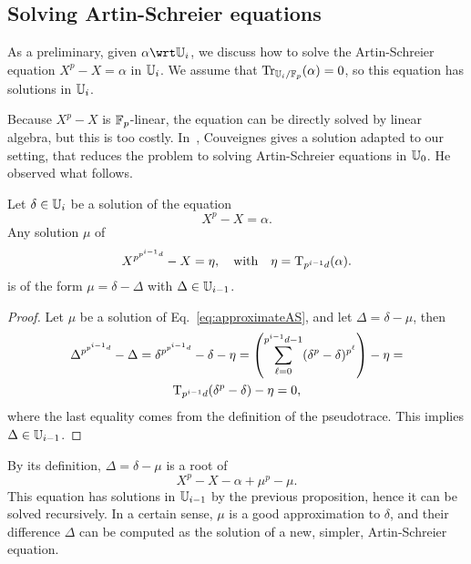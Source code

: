 
\subsection{Solving Artin-Schreier equations} 

As a preliminary, given $\alpha\wrt \U_i$, we discuss how to
solve the Artin-Schreier equation $X^p-X=\alpha$ in $\mathbb{U}_i$. We assume
that $\operatorname{Tr}_{\mathbb{U}_i/\mathbb{F}_p}(\alpha)=0$, so this equation has solutions in
$\mathbb{U}_i$.

Because $X^p-X$ is $\mathbb{F}_p$-linear, the equation can be directly solved
by linear algebra, but this is too costly. In~\cite{couveignes00},
Couveignes gives a solution adapted to our setting, that reduces the
problem to solving Artin-Schreier equations in $\mathbb{U}_0$. He observed
what follows.

\begin{proposition}
  Let $\delta\in\mathbb{U}_i$ be a solution of the equation 
  \begin{equation}
    \label{eq:106}
    X^p - X = \alpha
    \text{.}    
  \end{equation}
  Any solution $\mu$ of
  \begin{equation}
    \label{eq:approximateAS}
    X^{p^{p^{i-1}d}} - X = \eta, \quad\text{with}\quad \eta=\operatorname{T}_{p^{i-1}d}(\alpha).
  \end{equation}
  is of the form $\mu=\delta - \Delta$ with $\Delta\in\mathbb{U}_{i-1}$.
\end{proposition}
\begin{proof}
  Let $\mu$ be a solution of Eq.~\eqref{eq:approximateAS}, and let
  $\Delta=\delta-\mu$, then
  \begin{multline}
    \label{eq:108}
    \Delta^{p^{p^{i-1}d}} - \Delta = \delta^{p^{p^{i-1}d}} - \delta - \eta =
    \left(\sum_{\ell=0}^{p^{i-1}d-1}(\delta^{p}-\delta)^{p^\ell}\right) - \eta =\\
    \operatorname{T}_{p^{i-1}d}(\delta^p-\delta) - \eta = 0
    \text{,}
  \end{multline}
  where the last equality comes from the definition of the
  pseudotrace. This implies $\Delta\in\mathbb{U}_{i-1}$.
\end{proof}

By its definition, $\Delta=\delta-\mu$ is a root of
\begin{equation}
  \label{eq:approximant}
  X^p-X-\alpha+\mu^p-\mu.
\end{equation}
This equation has solutions in $\mathbb{U}_{i-1}$ by the previous proposition,
hence it can be solved recursively. In a certain sense, $\mu$ is a
good approximation to $\delta$, and their difference $\Delta$ can be
computed as the solution of a new, simpler, Artin-Schreier equation.

